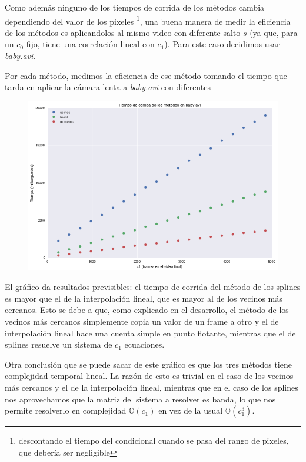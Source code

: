 Como adem\'as ninguno de los tiempos de corrida de los m\'etodos cambia
dependiendo del valor de los pixeles \footnote{descontando el tiempo del
condicional cuando se pasa del rango de pixeles, que deber\'ia ser negligible},
una buena manera de medir la eficiencia de los m\'etodos es aplicandolos al
mismo video con diferente salto $s$ (ya que, para un $c_0$ fijo, tiene una
correlaci\'on lineal con $c_1$). Para este caso decidimos usar
\textit{baby.avi}.

Por cada m\'etodo, medimos la eficiencia de ese m\'etodo tomando el tiempo que
tarda en aplicar la c\'amara lenta a \textit{baby.avi} con diferentes 

\begin{figure}[H]
\centering
\includegraphics[width=.95\textwidth]{graficos/tiempo_baby.png}
\end{figure}

El gr\'afico da resultados previsibles: el tiempo de corrida del m\'etodo de los
splines es mayor que el de la interpolaci\'on lineal, que es mayor al de los
vecinos m\'as cercanos. Esto se debe a que, como explicado en el desarrollo,
el m\'etodo de los vecinos m\'as cercanos simplemente copia un valor de un
frame a otro y el de interpolaci\'on lineal hace una cuenta simple en punto
flotante, mientras que el de splines resuelve un sistema de $c_1$ ecuaciones.

Otra conclusi\'on que se puede sacar de este gr\'afico es que los tres m\'etodos
tiene complejidad temporal lineal. La raz\'on de esto es trivial en el caso de los
vecinos m\'as cercanos y el de la interpolaci\'on lineal, mientras que en el
caso de los splines nos aprovechamos que la matriz del sistema a resolver es
banda, lo que nos permite resolverlo en complejidad $\mathbb{O}(c_1)$ en vez de
la usual $\mathbb{O}(c_1^3)$.

